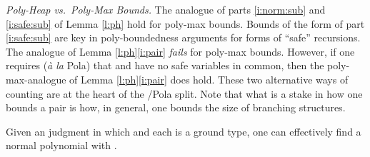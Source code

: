\documentclass[envcountsame]{llncs}
\begin{document}
\emph{Poly-Heap vs.~Poly-Max Bounds.}
The analogue of parts \eqref{i:norm:sub} and \eqref{i:safe:sub} 
of Lemma \ref{l:ph} hold for poly-max bounds. 
Bounds of the form of part \eqref{i:safe:sub} are key in 
poly-boundedness arguments for forms of ``safe'' recursions. 
The analogue of Lemma \ref{l:ph}\eqref{i:pair} \emph{fails}
for poly-max bounds.  However, if one requires (\emph{\`a la} Pola)
that  and  have no safe variables in common, then 
the poly-max-analogue of Lemma \ref{l:ph}\eqref{i:pair} 
does hold.
These two alternative ways of counting are at the heart of 
the /Pola  split.  Note that what is a stake in how one
bounds a pair is how, in general, one bounds the size of 
branching structures.








\begin{theorem} 
Given an  judgment   in which
   and each  is a ground type, one can
  effectively find a normal polynomial  with
  .
\end{theorem}
\end{document}
